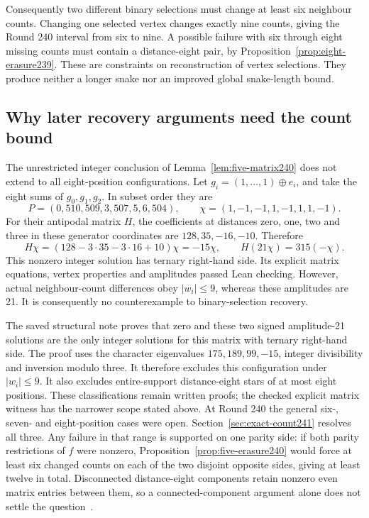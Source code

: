 \documentclass[11pt,a4paper]{article}
\theoremstyle{definition}
\theoremstyle{remark}
\begin{document}
Consequently two different binary selections must change at least six
neighbour counts. Changing one selected vertex changes exactly nine
counts, giving the Round 240 interval from six to nine. A possible failure
with six through eight missing counts must contain a distance-eight
pair, by Proposition~\ref{prop:eight-erasure239}. These are constraints
on reconstruction of vertex selections. They produce neither a longer
snake nor an improved global snake-length bound.


\subsection{Why later recovery arguments need the count bound}
\label{sec:eight-matrix-limit240}
The unrestricted integer conclusion of Lemma~\ref{lem:five-matrix240}
does not extend to all eight-position configurations. Let
$g_i=(1,\ldots,1)\mathbin{\oplus}e_i$, and take the eight sums of
$g_0,g_1,g_2$. In subset order they are
\[
P=(0,510,509,3,507,5,6,504),\qquad
\chi=(1,-1,-1,1,-1,1,1,-1).
\]
For their antipodal matrix $H$, the coefficients at distances zero,
one, two and three in these generator coordinates are $128,35,-16,-10$.
Therefore
\[
H\chi=(128-3\cdot35-3\cdot16+10)\chi=-15\chi,
\qquad H(21\chi)=315(-\chi).
\]
This nonzero integer solution has ternary right-hand side. Its explicit
matrix equations, vertex properties and amplitudes passed Lean checking.
However, actual neighbour-count differences obey $|w_i|\le9$, whereas
these amplitudes are 21. It is consequently no counterexample to
binary-selection recovery.

The saved structural note proves that zero and these two signed
amplitude-21 solutions are the only integer solutions for this matrix
with ternary right-hand side. The proof uses the character eigenvalues
$175,189,99,-15$, integer divisibility and inversion modulo three.
It therefore excludes this configuration under $|w_i|\le9$.
It also excludes entire-support distance-eight stars of at most eight
positions. These classifications remain written proofs; the checked
explicit matrix witness has the narrower scope stated above.
At Round 240 the general six-, seven- and eight-position cases were open.
Section~\ref{sec:exact-count241} resolves all three.
Any failure in that range is supported on one parity side: if both
parity restrictions of $f$ were nonzero, Proposition~\ref{prop:five-erasure240}
would force at least six changed counts on each of the two disjoint
opposite sides, giving at least twelve in total.
Disconnected distance-eight components retain nonzero even matrix
entries between them, so a connected-component argument alone does
not settle the question~\cite{research240}.
\end{document}
